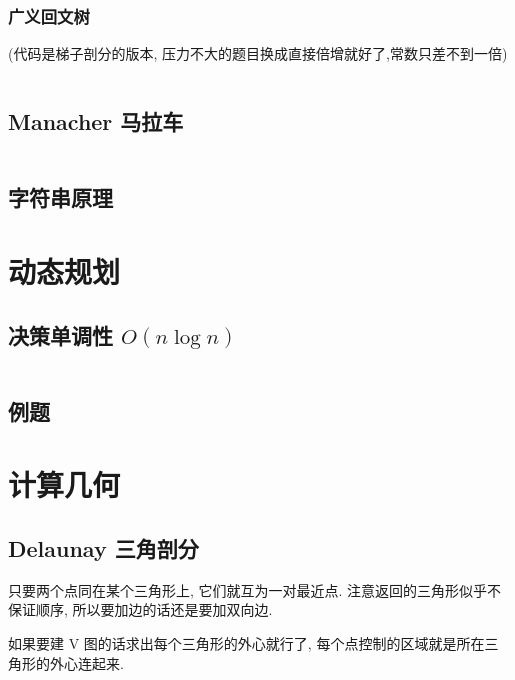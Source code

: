 \documentclass[a4paper, twoside]{article}
\begin{document}
\begin{multicols}{2}
				\subsubsection{广义回文树}
					(代码是梯子剖分的版本, 压力不大的题目换成直接倍增就好了,常数只差不到一倍)
					\inputminted{cpp}{../src/string/广义回文树.cpp}



			\subsection{Manacher 马拉车}
				\inputminted{cpp}{../src/string/manacher.cpp}
			


			\subsection{字符串原理}
				

		\newpage
		\section{动态规划}
			\subsection{决策单调性 $O(n\log n)$}
				\inputminted{cpp}{../src/dp/决策单调性.cpp}
			
			\subsection{例题}
				

		\newpage
		\section{计算几何}
		 	\subsection{Delaunay 三角剖分}
				只要两个点同在某个三角形上, 它们就互为一对最近点. 注意返回的三角形似乎不保证顺序, 所以要加边的话还是要加双向边.
				
				如果要建 V 图的话求出每个三角形的外心就行了, 每个点控制的区域就是所在三角形的外心连起来.
				\inputminted{cpp}{../src/geometry/delaunay.cpp}
		
	\end{multicols}
			
\end{document}
